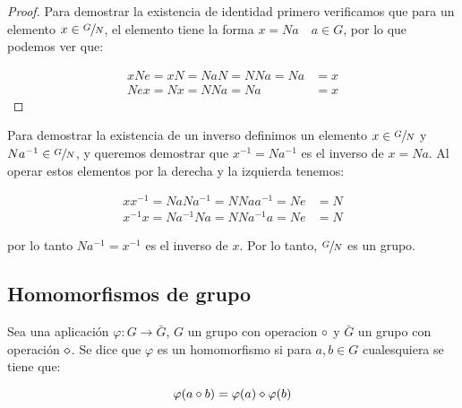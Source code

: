         \begin{proof}
            Para demostrar la existencia de identidad primero verificamos que para un elemento $x \in \sfrac{G}{N}$, el elemento tiene la forma $x = Na \quad a \in G$, por lo que podemos ver que:

            \begin{align*}
                xNe = xN = Na N = NNa = Na &= x \\
                Nex = Nx = NNa = Na &= x
            \end{align*}
        \end{proof}

        Para demostrar la existencia de un inverso definimos un elemento $x \in \sfrac{G}{N}$ y $Na^{-1} \in \sfrac{G}{N}$, y queremos demostrar que $x^{-1} = Na^{-1}$ es el inverso de $x = Na$. Al operar estos elementos por la derecha y la izquierda tenemos:

        \begin{align*}
            x x^{-1} = Na Na^{-1} = NNaa^{-1} = Ne &= N \\
            x^{-1} x = Na^{-1} Na = NNa^{-1}a = Ne &= N
        \end{align*}

        por lo tanto $Na^{-1} = x^{-1}$ es el inverso de $x$.
        Por lo tanto, $\sfrac{G}{N}$ es un grupo.

    \newpage
    \subsection{Homomorfismos de grupo}

        \begin{definicion}
            Sea una aplicación $\varphi \colon G \to \bar{G}$, $G$ un grupo con operacion $\circ$ y $\bar{G}$ un grupo con operación $\diamond$. Se dice que $\varphi$ es un homomorfismo si para $a, b \in G$ cualesquiera se tiene que:

            \begin{equation}
                \varphi(a \circ b) = \varphi(a) \diamond \varphi(b)
            \end{equation}
        \end{definicion}

